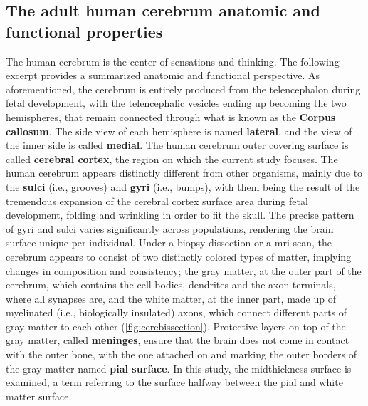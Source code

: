 \subsection{The adult human cerebrum anatomic and functional properties}
 The human cerebrum is the center of sensations and thinking. The following excerpt provides a summarized anatomic \cite{Bear2016chapter7app} and functional \cite{Ferng2022} perspective.  As aforementioned, the cerebrum is entirely produced  from the telencephalon during fetal development, with the telencephalic vesicles ending up becoming the two hemispheres, that remain connected through what is known as the \textbf{Corpus callosum}.  The side view of each hemisphere is named \textbf{lateral}, and the view of the inner side is called \textbf{medial}. The human cerebrum outer covering surface is called \textbf{cerebral cortex}, the region on which the current study focuses. The human cerebrum appears distinctly different from other organisms, mainly due to the \textbf{sulci} (i.e., grooves) and \textbf{gyri} (i.e., bumps), with them being the result of the tremendous expansion of the cerebral cortex surface area during fetal development, folding and wrinkling in order to fit the skull. The precise pattern of gyri and sulci varies significantly across populations, rendering the brain surface unique per individual. Under a biopsy dissection or a \ac{mri} scan, the cerebrum appears to consist of two distinctly colored types of matter, implying changes in composition and consistency; the gray matter, at the outer part of the cerebrum, which  contains the cell bodies, dendrites and the axon terminals, where all synapses are, and the white matter, at the inner part, made up of myelinated (i.e., biologically insulated) axons, which connect different parts of gray matter to each other (\autoref{fig:cerebissection}). Protective layers on top of the gray matter, called \textbf{meninges}, ensure that the brain does not come in contact with the outer bone, with the one attached on and marking the outer borders of the gray matter named \textbf{pial surface}. In this study, the midthickness surface is examined, a term referring to the surface halfway between the pial and white matter surface. 

